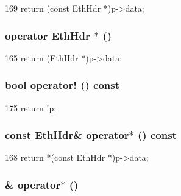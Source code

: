 \begin{DoxyCode}
169 { return (const EthHdr *)p->data; }
\end{DoxyCode}
\hypertarget{classNet_1_1EthPtr_a9b3d3c77c792d971ebf5f4f2e07ff5e1}{
\subsubsection[{operator EthHdr $\ast$}]{\setlength{\rightskip}{0pt plus 5cm}operator {\bf EthHdr} $\ast$ ()}}
\label{classNet_1_1EthPtr_a9b3d3c77c792d971ebf5f4f2e07ff5e1}



\begin{DoxyCode}
165 { return (EthHdr *)p->data; }
\end{DoxyCode}
\hypertarget{classNet_1_1EthPtr_ac8b1d32dbd52d431450c70b151cfa205}{
\subsubsection[{operator!}]{\setlength{\rightskip}{0pt plus 5cm}bool operator! () const}}
\label{classNet_1_1EthPtr_ac8b1d32dbd52d431450c70b151cfa205}



\begin{DoxyCode}
175 { return !p; }
\end{DoxyCode}
\hypertarget{classNet_1_1EthPtr_a9a3bab93af9c16eed0a09f218657b76a}{
\subsubsection[{operator$\ast$}]{\setlength{\rightskip}{0pt plus 5cm}const {\bf EthHdr}\& operator$\ast$ () const}}
\label{classNet_1_1EthPtr_a9a3bab93af9c16eed0a09f218657b76a}



\begin{DoxyCode}
168 { return *(const EthHdr *)p->data; }
\end{DoxyCode}
\hypertarget{classNet_1_1EthPtr_ac8e3102ab3c8268a484913e355ff61c2}{
\subsubsection[{operator$\ast$}]{\& operator$\ast$ ()}}
\label{classNet_1_1EthPtr_ac8e3102ab3c8268a484913e355ff61c2}



